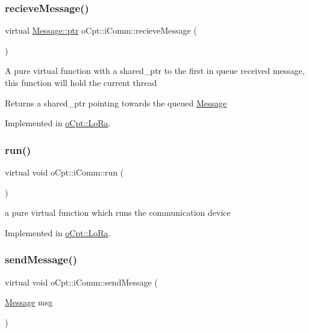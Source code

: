 \subsubsection{\texorpdfstring{recieve\+Message()}{recieveMessage()}}
{\footnotesize\ttfamily virtual \hyperlink{structo_cpt_1_1i_comm_1_1_message_ad2ba828ad76f96a30e3898b2609a4c01}{Message\+::ptr} o\+Cpt\+::i\+Comm\+::recieve\+Message (\begin{DoxyParamCaption}{ }\end{DoxyParamCaption})\hspace{0.3cm}{\ttfamily [pure virtual]}}

A pure virtual function with a shared\+\_\+ptr to the first in queue received message, this function will hold the current thread \begin{DoxyReturn}{Returns}
a shared\+\_\+ptr pointing towards the queued \hyperlink{structo_cpt_1_1i_comm_1_1_message}{Message} 
\end{DoxyReturn}


Implemented in \hyperlink{classo_cpt_1_1_lo_ra_a191e265a569a80c53e6829d57d402969}{o\+Cpt\+::\+Lo\+Ra}.

\hypertarget{classo_cpt_1_1i_comm_a0d15a29fb59dd6a74b56a126d03b9170}{}\label{classo_cpt_1_1i_comm_a0d15a29fb59dd6a74b56a126d03b9170} 
\subsubsection{\texorpdfstring{run()}{run()}}
{\footnotesize\ttfamily virtual void o\+Cpt\+::i\+Comm\+::run (\begin{DoxyParamCaption}{ }\end{DoxyParamCaption})\hspace{0.3cm}{\ttfamily [pure virtual]}}

a pure virtual function which runs the communication device 

Implemented in \hyperlink{classo_cpt_1_1_lo_ra_aacbca715826b810736e9bf5c3a9ce338}{o\+Cpt\+::\+Lo\+Ra}.

\hypertarget{classo_cpt_1_1i_comm_aed3d4364175d17efc0347b6e954f5aef}{}\label{classo_cpt_1_1i_comm_aed3d4364175d17efc0347b6e954f5aef} 
\subsubsection{\texorpdfstring{send\+Message()}{sendMessage()}}
{\footnotesize\ttfamily virtual void o\+Cpt\+::i\+Comm\+::send\+Message (\begin{DoxyParamCaption}\item[{\hyperlink{structo_cpt_1_1i_comm_1_1_message}{Message}}]{msg }\end{DoxyParamCaption})\hspace{0.3cm}{\ttfamily [pure virtual]}}

